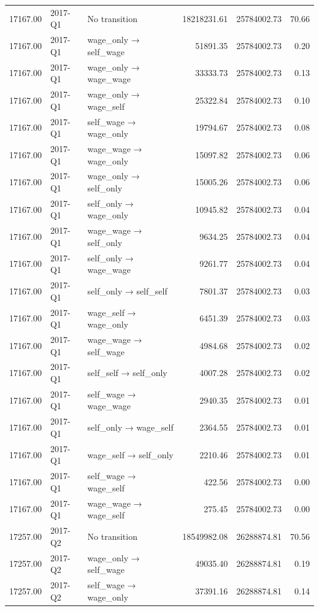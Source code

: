 \begin{table}[ht]
{\begin{tabular}{rllrrr}
  17167.00 & 2017-Q1 & No transition & 18218231.61 & 25784002.73 & 70.66 \\ 
  17167.00 & 2017-Q1 & wage\_only → self\_wage & 51891.35 & 25784002.73 & 0.20 \\ 
  17167.00 & 2017-Q1 & wage\_only → wage\_wage & 33333.73 & 25784002.73 & 0.13 \\ 
  17167.00 & 2017-Q1 & wage\_only → wage\_self & 25322.84 & 25784002.73 & 0.10 \\ 
  17167.00 & 2017-Q1 & self\_wage → wage\_only & 19794.67 & 25784002.73 & 0.08 \\ 
  17167.00 & 2017-Q1 & wage\_wage → wage\_only & 15097.82 & 25784002.73 & 0.06 \\ 
  17167.00 & 2017-Q1 & wage\_only → self\_only & 15005.26 & 25784002.73 & 0.06 \\ 
  17167.00 & 2017-Q1 & self\_only → wage\_only & 10945.82 & 25784002.73 & 0.04 \\ 
  17167.00 & 2017-Q1 & wage\_wage → self\_only & 9634.25 & 25784002.73 & 0.04 \\ 
  17167.00 & 2017-Q1 & self\_only → wage\_wage & 9261.77 & 25784002.73 & 0.04 \\ 
  17167.00 & 2017-Q1 & self\_only → self\_self & 7801.37 & 25784002.73 & 0.03 \\ 
  17167.00 & 2017-Q1 & wage\_self → wage\_only & 6451.39 & 25784002.73 & 0.03 \\ 
  17167.00 & 2017-Q1 & wage\_wage → self\_wage & 4984.68 & 25784002.73 & 0.02 \\ 
  17167.00 & 2017-Q1 & self\_self → self\_only & 4007.28 & 25784002.73 & 0.02 \\ 
  17167.00 & 2017-Q1 & self\_wage → wage\_wage & 2940.35 & 25784002.73 & 0.01 \\ 
  17167.00 & 2017-Q1 & self\_only → wage\_self & 2364.55 & 25784002.73 & 0.01 \\ 
  17167.00 & 2017-Q1 & wage\_self → self\_only & 2210.46 & 25784002.73 & 0.01 \\ 
  17167.00 & 2017-Q1 & self\_wage → wage\_self & 422.56 & 25784002.73 & 0.00 \\ 
  17167.00 & 2017-Q1 & wage\_wage → wage\_self & 275.45 & 25784002.73 & 0.00 \\ 
  17257.00 & 2017-Q2 & No transition & 18549982.08 & 26288874.81 & 70.56 \\ 
  17257.00 & 2017-Q2 & wage\_only → self\_wage & 49035.40 & 26288874.81 & 0.19 \\ 
  17257.00 & 2017-Q2 & self\_wage → wage\_only & 37391.16 & 26288874.81 & 0.14 \\ 

\end{tabular}}
\end{table}
